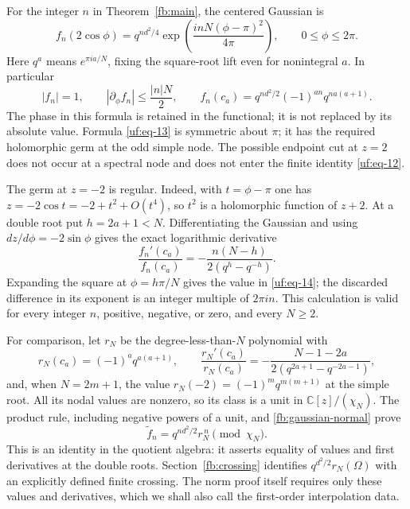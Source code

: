 \documentclass[11pt]{article}
\numberwithin{equation}{section}
\theoremstyle{definition}\newtheorem{definition}[theorem]{Definition}
\theoremstyle{remark}\newtheorem{remark}[theorem]{Remark}
\begin{document}
For the integer $n$ in Theorem~\ref{fb:main}, the centered Gaussian
is \begin{equation}\label{uf:eq-13}
f_n(2\cos\phi)=q^{nd^2/4}
          \exp\left(\frac{inN(\phi-\pi)^2}{4\pi}\right),
 \qquad 0\le\phi\le2\pi.
\end{equation} Here \(q^a\) means \(e^{\pi ia/N}\), fixing the square-root
lift even for nonintegral \(a\). In particular \begin{equation}\label{uf:eq-14}
|f_n|=1,\qquad |\partial_\phi f_n|\le\frac{|n|N}{2},\qquad
 f_n(c_a)=q^{nd^2/2}(-1)^{an}q^{na(a+1)}.
\end{equation} The phase in this formula is retained in the functional; it is not
replaced by its absolute value. Formula \eqref{uf:eq-13} is symmetric about \(\pi\); it
has the required holomorphic germ at the odd simple node. The possible
endpoint cut at \(z=2\) does not occur at a spectral node and does not
enter the finite identity \eqref{uf:eq-12}.


The germ at $z=-2$ is regular. Indeed, with $t=\phi-\pi$ one has
$z=-2\cos t=-2+t^2+O(t^4)$, so $t^2$ is a holomorphic function of
$z+2$. At a double root put $h=2a+1<N$. Differentiating the Gaussian
and using $dz/d\phi=-2\sin\phi$ gives the exact logarithmic derivative
\begin{equation}\label{fb:gaussian-normal}
 \frac{f_n'(c_a)}{f_n(c_a)}
   =-\frac{n(N-h)}{2(q^h-q^{-h})}.
\end{equation}
Expanding the square at $\phi=h\pi/N$ gives the value in
\eqref{uf:eq-14}; the discarded difference in its exponent is an
integer multiple of $2\pi i n$. This calculation is valid for every
integer $n$, positive, negative, or zero, and every $N\ge2$.

For comparison, let $r_N$ be the degree-less-than-$N$ polynomial with
\[
 r_N(c_a)=(-1)^a q^{a(a+1)},\qquad
 \frac{r_N'(c_a)}{r_N(c_a)}
       =-\frac{N-1-2a}{2(q^{2a+1}-q^{-2a-1})},
\]
and, when $N=2m+1$, the value
$r_N(-2)=(-1)^m q^{m(m+1)}$ at the simple root. All its
nodal values are nonzero, so its class is a unit in
$\mathbb C[z]/(\chi_N)$. The product rule, including negative powers
of a unit, and \eqref{fb:gaussian-normal} prove
\begin{equation}\label{fb:polynomial-power}
 \widetilde f_n=q^{nd^2/2}r_N^{\,n}\pmod{\chi_N}.
\end{equation}
This is an identity in the quotient algebra: it asserts equality of
values and first derivatives at the double roots. Section~\ref{fb:crossing} identifies $q^{d^2/2}r_N(\Omega)$
with an explicitly defined finite crossing. The norm proof itself
requires only these values and derivatives, which we shall also call
the first-order interpolation data.
\end{document}
